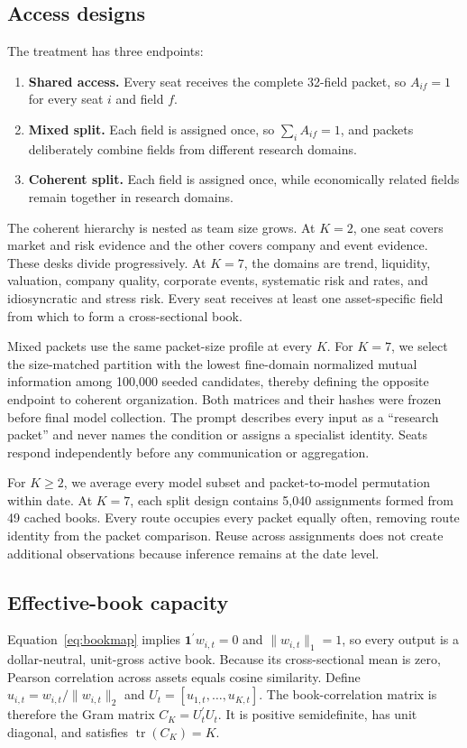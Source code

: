 \documentclass[sigconf]{acmart}
\begin{document}
\subsection{Access designs}
The treatment has three endpoints:
\begin{enumerate}[leftmargin=1.8em,label=\textbf{A\arabic*.},itemsep=2pt,topsep=2pt,parsep=0pt]
\item \textbf{Shared access.} Every seat receives the complete 32-field packet, so $A_{if}=1$ for every seat $i$ and field $f$.
\item \textbf{Mixed split.} Each field is assigned once, so $\sum_i A_{if}=1$, and packets deliberately combine fields from different research domains.
\item \textbf{Coherent split.} Each field is assigned once, while economically related fields remain together in research domains.
\end{enumerate}

The coherent hierarchy is nested as team size grows. At $K=2$, one seat covers market and risk evidence and the other covers company and event evidence. These desks divide progressively. At $K=7$, the domains are trend, liquidity, valuation, company quality, corporate events, systematic risk and rates, and idiosyncratic and stress risk. Every seat receives at least one asset-specific field from which to form a cross-sectional book.

Mixed packets use the same packet-size profile at every $K$. For $K=7$, we select the size-matched partition with the lowest fine-domain normalized mutual information among 100,000 seeded candidates, thereby defining the opposite endpoint to coherent organization. Both matrices and their hashes were frozen before final model collection. The prompt describes every input as a ``research packet'' and never names the condition or assigns a specialist identity. Seats respond independently before any communication or aggregation.

For $K\geq2$, we average every model subset and packet-to-model permutation within date. At $K=7$, each split design contains 5,040 assignments formed from 49 cached books. Every route occupies every packet equally often, removing route identity from the packet comparison. Reuse across assignments does not create additional observations because inference remains at the date level.

\subsection{Effective-book capacity}
Equation~\eqref{eq:bookmap} implies $\mathbf{1}^{\prime}w_{i,t}=0$ and $\lVert w_{i,t}\rVert_1=1$, so every output is a dollar-neutral, unit-gross active book. Because its cross-sectional mean is zero, Pearson correlation across assets equals cosine similarity. Define $u_{i,t}=w_{i,t}/\lVert w_{i,t}\rVert_2$ and $U_t=[u_{1,t},\ldots,u_{K,t}]$. The book-correlation matrix is therefore the Gram matrix $C_K=U_t^{\prime}U_t$. It is positive semidefinite, has unit diagonal, and satisfies $\operatorname{tr}(C_K)=K$.
\end{document}

